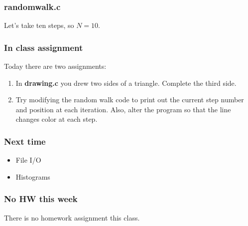 \documentclass{beamer}
\begin{document}
\begin{frame}
  \frametitle{randomwalk.c}
  Let's take ten steps, so $N=10$.
  
\end{frame}

\begin{frame}
  \frametitle{In class assignment}
  Today there are two assignments:
  \begin{enumerate}
  \item In \textbf{drawing.c} you drew two sides of a triangle. Complete the
    third side.
  \item Try modifying the random walk code to print out the current step
    number and position at each iteration. Also, alter the program so that
    the line changes color at each step.
  \end{enumerate}
\end{frame}

\begin{frame}
  \frametitle{Next time}
  \begin{itemize}
    \item File I/O
    \item Histograms
  \end{itemize}
\end{frame}

\begin{frame}
  \frametitle{No HW this week}
  There is no homework assignment this class.
\end{frame}
\end{document}
